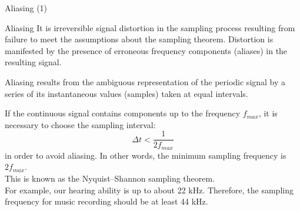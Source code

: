 \documentclass[10pt,aspectratio=169]{beamer} %
\begin{document}
\begin{frame}{Aliasing (1)}
	\begin{alertblock}{Aliasing}
		It is irreversible signal distortion in the sampling process resulting from failure to meet the assumptions about the sampling theorem. 
		Distortion is manifested by the presence of erroneous frequency components (aliases) in the resulting signal.
	\end{alertblock}
	Aliasing results from the ambiguous representation of the periodic signal by a series of its instantaneous values (samples) taken at equal intervals.
	
	If the continuous signal contains components up to the frequency \(f_{max}\), it is necessary to choose the \alert{sampling interval}:
	\begin{equation*}
	\boxed{\Delta t < \frac{1}{2 f_{max}}}
	\end{equation*}
	in order to avoid aliasing. In other words, the \alert{minimum sampling frequency is \(2 f_{max}\)}.\\
	This is known as the \alert{Nyquist–Shannon sampling theorem}.\\
	For example, our hearing ability is up to about 22 kHz.
	Therefore, the sampling frequency for music recording should be at least 44 kHz.
\end{frame}
\end{document}
